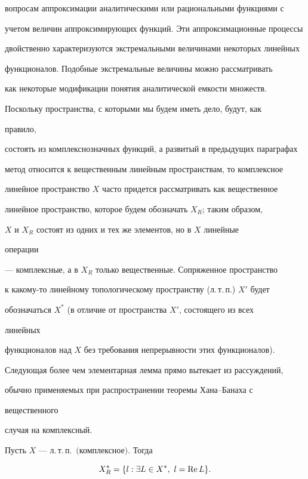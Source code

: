 вопросам аппроксимации аналитическими или рациональными функциями с 


учетом величин аппроксимирующих функций. Эти аппроксимационные процессы 


двойственно характеризуются экстремальными величинами некоторых линейных 


функционалов. Подобные экстремальные величины можно рассматривать


как некоторые модификации понятия аналитической емкости множеств. 


 


Поскольку пространства, с которыми мы будем иметь дело, будут, как 


правило, 


состоять из комплекснозначных функций, а развитый в предыдущих параграфах 


метод относится к вещественным линейным пространствам, то комплексное 


линейное пространство $X$ часто придется рассматривать как вещественное 


линейное пространство, которое будем обозначать $X_R$; таким образом, 


$X$ и $X_R$ состоят из одних и тех же элементов, но в $X$ линейные 


операции 


--- комплексные, а в $X_R$ только вещественные. Сопряженное пространство 


к какому-то линейному топологическому пространству (л.\,т.\,п.) $X'$ будет 


обозначаться $X^*$ (в отличие от пространства $X'$, состоящего из всех 


линейных 


функционалов над $X$ без требования непрерывности этих функционалов). 


Следующая более чем элементарная лемма прямо вытекает из рассуждений, 


обычно применяемых при распространении теоремы Хана--Банаха с 


вещественного 


случая на комплексный. 


 


\begin{lems} 


Пусть $X$ --- л.\,т.\,п.\ $($комплексное\/$)$. Тогда 


\begin{equation} 


X^*_R=\{l:\exists L\in X^*,\ l=\re L\}. 


\end{equation} 


\end{lems} 


